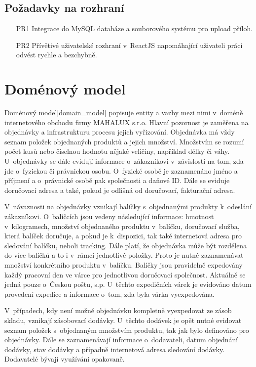 \documentclass[thesis=B,czech]{FITthesis}[2012/06/26]
\begin{document}
\subsection{Požadavky na rozhraní}
\begin{enumerate}
	\item[PR1] Integrace do MySQL databáze a souborového systému pro upload příloh.
	\item[PR2] Přívětivé uživatelské rozhraní v~ReactJS napomáhající uživateli práci odvést rychle a bezchybně.
\end{enumerate}

\section{Doménový model}
	Doménový model\ref{domain_model} popisuje entity a vazby mezi nimi v~doméně internetového obchodu firmy MAHALUX s.r.o. Hlavní pozornost je zaměřena na objednávky a infrastrukturu procesu jejich vyřizování. Objednávka má vždy seznam položek objednaných produktů a jejich množství. Množstvím se rozumí počet kusů nebo číselnou hodnotu nějaké veličiny, například délky či váhy. U~objednávky se dále evidují informace o~zákazníkovi v~závislosti na tom, zda jde o~fyzickou či právnickou osobu. O~fyzické osobě je zaznamenáno jméno a příjmení a o~právnické osobě pak společnosti a daňové ID. Dále se eviduje doručovací adresa a také, pokud je odlišná od doručovací, fakturační adresa.
	
	V~návaznosti na objednávky vznikají balíčky s~objednanými produkty k~odeslání zákazníkovi. O~balíčcích jsou vedeny následující informace: hmotnost v~kilogramech, množství objednaného produktu v~balíčku, doručovací služba, která balíček doručuje, a pokud je k~dispozici, tak také internetová adresa pro sledování balíčku, neboli tracking. Dále platí, že objednávka může být rozdělena do více balíčků a to i v~rámci jednotlivé položky. Proto je nutné zaznamenávat množství konkrétního produktu v~balíčku. Balíčky jsou pravidelně expedovány každý pracovní den ve várce pro jednotlivou doručovací společnost. Aktuálně se jedná pouze o~Českou poštu, s.p. U~těchto expedičních várek je evidováno datum provedení expedice a informace o~tom, zda byla várka vyexpedována.
	
	V~případech, kdy není možné objednávku kompletně vyexpedovat ze zásob skladu, vznikají zásobovací dodávky. U~těchto dodávek je opět nutné evidovat seznam položek s~objednaným množstvím produktu, tak jak bylo definováno pro objednávky. Dále se zaznamenávají informace o~dodavateli, datum objednání dodávky, stav dodávky a případně internetová adresa sledování dodávky. Dodavatelé bývají využíváni opakovaně.
	
\end{document}

